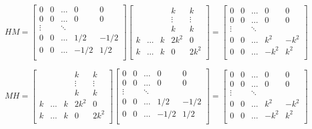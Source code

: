 \begin{dokaz}
\begin{center}
$
HM = 
\begin{bmatrix}
0 & 0 & \ldots & 0 & 0 \\
0 & 0 & \ldots & 0 & 0 \\
\vdots && \ddots \\
0 & 0 & \ldots & 1/2 & -1/2 \\
0 & 0 & \ldots & -1/2 & 1/2 \\
\end{bmatrix}
\begin{bmatrix}
&&& k & k \\
&&& \vdots & \vdots \\
&&& k & k \\
k & \ldots & k & 2k^2 & 0 \\
k & \ldots & k & 0 & 2k^2 \\
\end{bmatrix}
=
\begin{bmatrix}
0 & 0 & \ldots & 0 & 0 \\
0 & 0 & \ldots & 0 & 0 \\
\vdots && \ddots \\
0 & 0 & \ldots & k^2 & -k^2 \\
0 & 0 & \ldots & -k^2 & k^2 \\
\end{bmatrix}
$
\end{center}

\begin{center}
$
MH = 
\begin{bmatrix}
&&& k & k \\
&&& \vdots & \vdots \\
&&& k & k \\
k & \ldots & k & 2k^2 & 0 \\
k & \ldots & k & 0 & 2k^2 \\
\end{bmatrix}
\begin{bmatrix}
0 & 0 & \ldots & 0 & 0 \\
0 & 0 & \ldots & 0 & 0 \\
\vdots && \ddots \\
0 & 0 & \ldots & 1/2 & -1/2 \\
0 & 0 & \ldots & -1/2 & 1/2 \\
\end{bmatrix}
=
\begin{bmatrix}
0 & 0 & \ldots & 0 & 0 \\
0 & 0 & \ldots & 0 & 0 \\
\vdots && \ddots \\
0 & 0 & \ldots & k^2 & -k^2 \\
0 & 0 & \ldots & -k^2 & k^2 \\
\end{bmatrix}
$
\end{center}


\end{dokaz}
